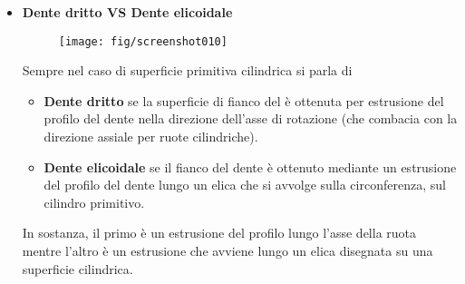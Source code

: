 \documentclass[a4paper, 15pt]{article}
\begin{document}
\begin{adjustwidth}{2in}{}
\begin{itemize}
		\item \textbf{Dente dritto VS Dente elicoidale}
		\begin{figure}[H]
			\centering
			\texttt{[image: fig/screenshot010]}
			\label{fig:screenshot010}
		\end{figure}
		Sempre nel caso di superficie primitiva cilindrica si parla di
		\begin{itemize}
			\item \textbf{Dente dritto} se la superficie di fianco del è ottenuta per estrusione del profilo del dente nella direzione dell'asse di rotazione (che combacia con la direzione assiale per ruote cilindriche).
			\item \textbf{Dente elicoidale} se il fianco del dente è ottenuto mediante un estrusione del profilo del dente lungo un elica che si avvolge sulla circonferenza, sul cilindro primitivo.			
		\end{itemize}
		In sostanza, il primo è un estrusione del profilo lungo l'asse della ruota mentre l'altro è un estrusione che avviene lungo un elica disegnata su una superficie cilindrica.		
	\end{itemize}
\end{adjustwidth}	
	
\end{document}
